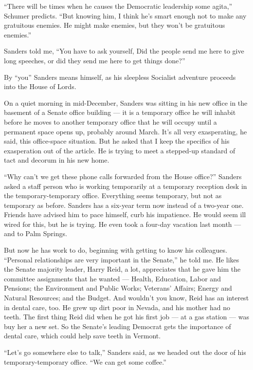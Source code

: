 ``There will be times when he causes the Democratic leadership some
agita,'' Schumer predicts. ``But knowing him, I think he's smart enough
not to make any gratuitous enemies. He might make enemies, but they
won't be gratuitous enemies.''

Sanders told me, ``You have to ask yourself, Did the people send me here
to give long speeches, or did they send me here to get things done?''

By ``you'' Sanders means himself, as his sleepless Socialist adventure
proceeds into the House of Lords.

On a quiet morning in mid-December, Sanders was sitting in his new
office in the basement of a Senate office building --- it is a temporary
office he will inhabit before he moves to another temporary office that
he will occupy until a permanent space opens up, probably around March.
It's all very exasperating, he said, this office-space situation. But he
asked that I keep the specifics of his exasperation out of the article.
He is trying to meet a stepped-up standard of tact and decorum in his
new home.

``Why can't we get these phone calls forwarded from the House office?''
Sanders asked a staff person who is working temporarily at a temporary
reception desk in the temporary-temporary office. Everything seems
temporary, but not as temporary as before. Sanders has a six-year term
now instead of a two-year one. Friends have advised him to pace himself,
curb his impatience. He would seem ill wired for this, but he is trying.
He even took a four-day vacation last month --- and to Palm Springs.

But now he has work to do, beginning with getting to know his
colleagues. ``Personal relationships are very important in the Senate,''
he told me. He likes the Senate majority leader, Harry Reid, a lot,
appreciates that he gave him the committee assignments that he wanted
--- Health, Education, Labor and Pensions; the Environment and Public
Works; Veterans' Affairs; Energy and Natural Resources; and the Budget.
And wouldn't you know, Reid has an interest in dental care, too. He grew
up dirt poor in Nevada, and his mother had no teeth. The first thing
Reid did when he got his first job --- at a gas station --- was buy her
a new set. So the Senate's leading Democrat gets the importance of
dental care, which could help save teeth in Vermont.

``Let's go somewhere else to talk,'' Sanders said, as we headed out the
door of his temporary-temporary office. ``We can get some coffee.''

